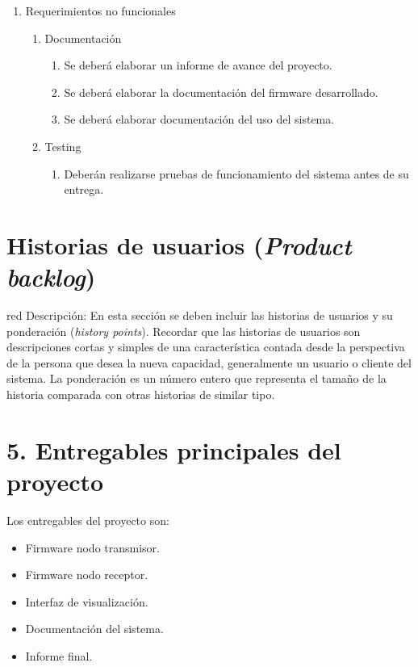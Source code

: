 \documentclass[11pt]{charter}
\begin{document}
\begin{enumerate}
\item Requerimientos no funcionales
	\begin{enumerate}
	\item Documentación
		\begin{enumerate}[label*=\arabic*.]
		\item Se deberá elaborar un informe de avance del proyecto.
		\item Se deberá elaborar la documentación del firmware desarrollado.
		\item Se deberá elaborar documentación del uso del sistema.
		\end{enumerate}
	\item Testing
		\begin{enumerate}[label*=\arabic*.]
		\item Deberán realizarse pruebas de funcionamiento del sistema antes de su entrega.
		\end{enumerate}
	\end{enumerate}
\end{enumerate}


\section{Historias de usuarios (\textit{Product backlog})}
\label{sec:backlog}

\begin{consigna}{red}
Descripción: En esta sección se deben incluir las historias de usuarios y su ponderación (\textit{history points}). Recordar que las historias de usuarios son descripciones cortas y simples de una característica contada desde la perspectiva de la persona que desea la nueva capacidad, generalmente un usuario o cliente del sistema. La ponderación es un número entero que representa el tamaño de la historia comparada con otras historias de similar tipo.
\end{consigna}

\section{5. Entregables principales del proyecto}
\label{sec:entregables}

Los entregables del proyecto son:
 
\begin{itemize}
\item Firmware nodo transmisor.
\item Firmware nodo receptor.
\item Interfaz de visualización.
\item Documentación del sistema.
\item Informe final.

\end{itemize}
\end{document}
